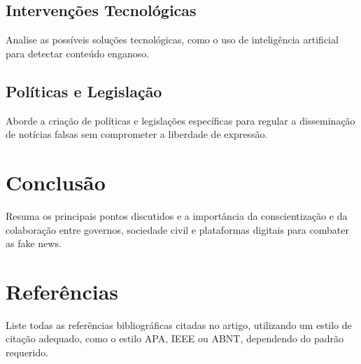 \documentclass[12pt]{article}
\begin{document}
\subsection{Intervenções Tecnológicas}
Analise as possíveis soluções tecnológicas, como o uso de inteligência artificial para detectar conteúdo enganoso.

\subsection{Políticas e Legislação}
Aborde a criação de políticas e legislações específicas para regular a disseminação de notícias falsas sem comprometer a liberdade de expressão.

\section{Conclusão}
Resuma os principais pontos discutidos e a importância da conscientização e da colaboração entre governos, sociedade civil e plataformas digitais para combater as fake news.

\section*{Referências}
Liste todas as referências bibliográficas citadas no artigo, utilizando um estilo de citação adequado, como o estilo APA, IEEE ou ABNT, dependendo do padrão requerido.
\end{document}
